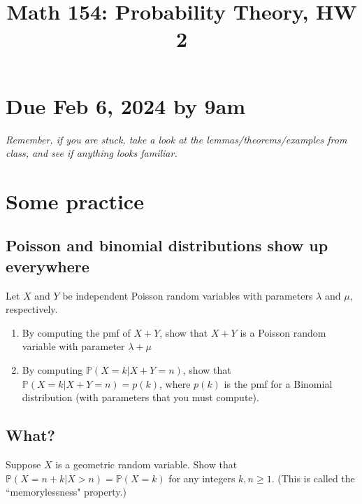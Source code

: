 \documentclass[12pt,reqno]{amsart}
\title{\Large Math 154: Probability Theory, HW 2\vspace{-0.1cm}}
\theoremstyle{definition}
\theoremstyle{remark}
\numberwithin{equation}{section}
\newenvironment{nouppercase}{%
  \let\uppercase\relax%
  \renewcommand{\uppercasenonmath}[1]{}}{}
\begin{document}
\begin{nouppercase}
\maketitle
\end{nouppercase}
\section*{Due Feb 6, 2024 by 9am}
\emph{Remember, if you are stuck, take a look at the lemmas/theorems/examples from class, and see if anything looks familiar.}
\section{Some practice}
\subsection{Poisson and binomial distributions show up everywhere}
Let $X$ and $Y$ be independent Poisson random variables with parameters $\lambda$ and $\mu$, respectively. 
\begin{enumerate}
\item By computing the pmf of $X+Y$, show that $X+Y$ is a Poisson random variable with parameter $\lambda+\mu$
\item By computing $\mathbb{P}(X=k|X+Y=n)$, show that $\mathbb{P}(X=k|X+Y=n)=p(k)$, where $p(k)$ is the pmf for a Binomial distribution (with parameters that you must compute).
\end{enumerate}
\subsection{What?}
Suppose $X$ is a geometric random variable. Show that $\mathbb{P}(X=n+k|X>n)=\mathbb{P}(X=k)$ for any integers $k,n\geq1$. (This is called the ``memorylessness" property.)
\end{document}
